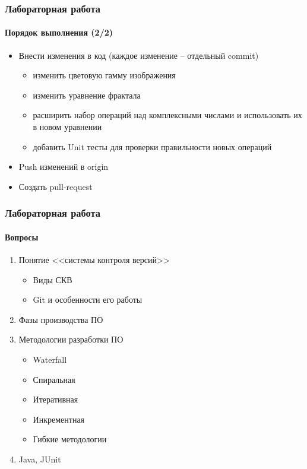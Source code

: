\documentclass[aspectratio=169, 12pt]{beamer}
\begin{document}
\begin{frame}[t]
    \frametitle{Лабораторная работа }
    \framesubtitle{Порядок выполнения (2/2)}
    \begin{itemize}
        \item Внести изменения в код (каждое изменение – отдельный commit) \pause
        \begin{itemize}
            \item изменить цветовую гамму изображения \pause
            \item изменить уравнение фрактала \pause
            \item расширить набор операций над комплексными числами и использовать их в новом уравнении \pause
            \item добавить Unit тесты для проверки правильности новых операций \pause
        \end{itemize}
        \item Push изменений в origin \pause
        \item Создать pull-request
    \end{itemize}
\end{frame}

\begin{frame}[t]
    \frametitle{Лабораторная работа }
    \framesubtitle{Вопросы} \pause
    \begin{enumerate}
        \item Понятие <<системы контроля версий>>
        \begin{itemize}
            \item Виды СКВ
            \item Git и особенности его работы
        \end{itemize} \pause
        \item Фазы производства ПО \pause
        \item Методологии разработки ПО
        \begin{itemize}
            \item Waterfall
            \item Спиральная
            \item Итеративная
            \item Инкрементная
            \item Гибкие методологии
        \end{itemize} \pause
        \item Java, JUnit
    \end{enumerate}
\end{frame}
\end{document}
